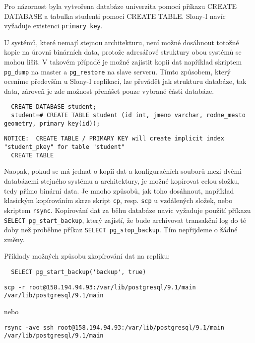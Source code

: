 Pro názornost byla vytvořena databáze univerzita pomocí příkazu CREATE DATABASE a tabulka studenti pomocí CREATE TABLE. Slony-I navíc vyžaduje existenci \texttt{primary key}.

 U systémů, které nemají stejnou architekturu, není možné dosáhnout totožné kopie na úrovni binárních data, protože adresářové struktury obou systémů se mohou lišit. V takovém případě je možné zajistit kopii dat například skriptem \texttt{pg\_dump} na master a \texttt{pg\_restore} na slave serveru. Tímto způsobem, který oceníme především u Slony-I replikaci, lze převádět jak strukturu databáze, tak data, zároveň je zde možnost přenášet pouze vybrané části databáze. 

\begin{lstlisting}
  CREATE DATABASE student;
  student=# CREATE TABLE student (id int, jmeno varchar, rodne_mesto geometry, primary key(id));
\end{lstlisting}
\begin{lstlisting}[keywordstyle=\color{black},identifierstyle=\color{black},stringstyle=\color{black}]
  NOTICE:  CREATE TABLE / PRIMARY KEY will create implicit index "student_pkey" for table "student"
  CREATE TABLE
\end{lstlisting}

Naopak, pokud se má jednat o kopii dat a konfiguračních souborů mezi dvěmi databázemi stejného systému a architektury, je možné kopírovat celou složku, tedy přímo binární data. Je mnoho způsobů, jak toho dosáhnout, například klasickým kopírováním skrze skript \texttt{cp}, resp. \texttt{scp} u vzdálených složek, nebo skriptem \texttt{rsync}. Kopírování dat za běhu databáze navíc vyžaduje použití příkazu \texttt{SELECT pg\_start\_backup}, který zajistí, že bude archivovat transakční log do té doby než proběhne příkaz \texttt{SELECT pg\_stop\_backup}. Tím nepřijdeme o žádné změny.

Příklady možných způsobu zkopírování dat na repliku:
\begin{lstlisting}
  SELECT pg_start_backup('backup', true)
\end{lstlisting}

\begin{lstlisting}[keywordstyle=\bfseries\color{purpurova7},identifierstyle=\color{black},stringstyle=\color{black}]
  scp -r root@158.194.94.93:/var/lib/postgresql/9.1/main /var/lib/postgresql/9.1/main
\end{lstlisting}
\begin{center}
nebo 
\end{center}
\begin{lstlisting}[keywordstyle=\bfseries\color{purpurova7},identifierstyle=\color{black},stringstyle=\color{black}]
  rsync -ave ssh root@158.194.94.93:/var/lib/postgresql/9.1/main /var/lib/postgresql/9.1/main
\end{lstlisting}

